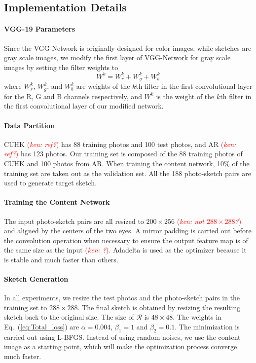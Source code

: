 \documentclass[10pt,twocolumn,letterpaper]{article}
\newcommand\ken[1]{{\small \textcolor{red}{(\emph{ken: #1})}}}
\begin{document}
\subsection{Implementation Details}

\paragraph*{VGG-19 Parameters} Since the VGG-Network is originally designed for color images, while sketches are gray scale images, we modify the first layer of VGG-Network for gray scale images by setting the filter weights to
\begin{equation}
W^{k} = W^{k}_r+W^{k}_g+W^{k}_b
\label{eq:VGG_weights}
\end{equation}
where $W^{k}_r$, $W^{k}_g$, and $W^{k}_b$ are weights of the $k$th filter in the first convolutional layer for the R, G and B channels respectively, and $W^{k}$ is the weight of the $k$th filter in the first convolutional layer of our modified network.

\paragraph{Data Partition} CUHK \ken{ref?} has 88 training photos and 100 test photos, and AR \ken{ref?} has 123 photos. Our training set is composed of the 88 training photos of CUHK and 100 photos from AR. When training the content network, 10\% of the training set are taken out as the validation set. All the 188 photo-sketch pairs are used to generate target sketch.

\paragraph{Training the Content Network} The input photo-sketch pairs are all resized to $200\times256$ \ken{not $288\times288$?} and aligned by the centers of the two eyes. A mirror padding is carried out before the convolution operation when necessary to ensure the output feature map is of the same size as the input \ken{?}. Adadelta \cite{matt2012adadelta} is used as the optimizer because it is stable and much faster than others.  

\paragraph{Sketch Generation} 
In all experiments, we resize the test photos and the photo-sketch pairs in the training set to $288\times288$. The final sketch is obtained by resizing the resulting sketch back to the original size. The size of $\mathcal{R}$ is $48\times48$. The weights in Eq.~(\ref{eq:Total_loss}) are $\alpha=0.004$, $\beta_1=1$ and $\beta_2=0.1$. The minimization is carried out using L-BFGS. Instead of using random noises, we use the content image as a starting point, which will make the optimization process converge much faster. 
\end{document}

